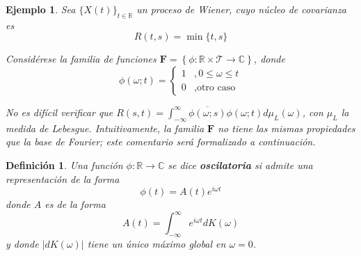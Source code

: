 \documentclass[12pt,letterpaper]{book}
\newtheorem{definicion}{Definición}[chapter]
\newtheorem{ejemplo}{Ejemplo}[chapter]
\newcommand{\R}{\mathbb{R}}
\newcommand{\C}{\mathbb{C}}
\newcommand{\intR}{\int_{-\infty}^{\infty}}
\newcommand{\ef}{\mathbf{F}}
\newcommand{\abso}[1]{\left| #1 \right|}
\newcommand{\xtin}[1]{$\{X(t)\}_{t\in \mathcal{ #1 }}$ }
\begin{document}
\begin{ejemplo}
Sea \xtin{\R} un proceso de Wiener, cuyo núcleo de covarianza es
\begin{equation}
R(t,s) = \min \{ t , s \}
\end{equation}

Considérese la familia de funciones $\ef = \left\{ \phi: \R \times \mathcal{T} \rightarrow \C \right\}$, donde
\begin{equation}
\phi(\omega; t) = \begin{cases}
1 &, 0 \leq \omega \leq t \\
0 &, \text{otro caso}
\end{cases}
\end{equation}

No es difícil verificar que $R(s,t) = \intR \overline{\phi(\omega;s)}\phi(\omega;t) d\mu_L(\omega)$, con $\mu_L$ la medida de Lebesgue.
%
Intuitivamente, la familia $\ef$ no tiene las mismas propiedades que la base de Fourier; este comentario será formalizado a continuación.
\end{ejemplo}

\begin{definicion}
\label{lazy2}
\label{oscilatorio}
Una función $\phi: \R \rightarrow \C$ se dice \textbf{oscilatoria} si admite una representación de la forma
\begin{equation}
\phi(t) = A(t) e^{i \omega t} 
\end{equation}
donde $A$ es de la forma
\begin{equation}
A(t) = \intR e^{i \omega t} dK(\omega)
\end{equation}
y donde $\abso{dK(\omega)}$ tiene un único máximo global en $\omega = 0$.
\end{definicion}
\end{document}
